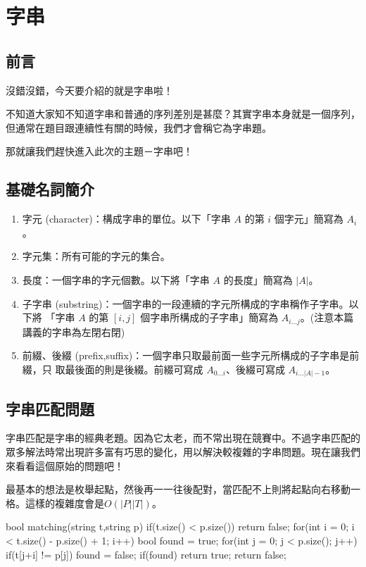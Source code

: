\chapter{字串\uppercase\expandafter{}}

\section{前言}
沒錯沒錯，今天要介紹的就是字串啦！

不知道大家知不知道字串和普通的序列差別是甚麼？其實字串本身就是一個序列，但通常在題目跟連續性有關的時候，我們才會稱它為字串題。

那就讓我們趕快進入此次的主題－字串吧！
\section{基礎名詞簡介}
\begin{enumerate}
\item 字元 (character)：構成字串的單位。以下「字串 $A$ 的第 $i$ 個字元」簡寫為 $A_i$。
\item 字元集：所有可能的字元的集合。
\item 長度：一個字串的字元個數。以下將「字串 $A$ 的長度」簡寫為 $|A|$。
\item 子字串 (substring)：一個字串的一段連續的字元所構成的字串稱作子字串。以下將
「字串 $A$ 的第 $[i, j]$ 個字串所構成的子字串」簡寫為 $A_{i...j}$。(注意本篇講義的字串為左閉右閉)
\item 前綴、後綴 (prefix,suffix)：一個字串只取最前面一些字元所構成的子字串是前綴，只
取最後面的則是後綴。前綴可寫成 $A_{0...i}$、後綴可寫成 $A_{i...|A|-1}$。
\end{enumerate}

\section{字串匹配問題}
字串匹配是字串的經典老題。因為它太老，而不常出現在競賽中。不過字串匹配的眾多解法時常出現許多富有巧思的變化，用以解決較複雜的字串問題。現在讓我們來看看這個原始的問題吧！\\


最基本的想法是枚舉起點，然後再一一往後配對，當匹配不上則將起點向右移動一格。這樣的複雜度會是$O(|P||T|)$。\\

\begin{C++}
bool matching(string t,string p){
    if(t.size() < p.size()) return false;
    for(int i = 0; i < t.size() - p.size() + 1; i++){
        bool found = true;
        for(int j = 0; j < p.size(); j++)
            if(t[j+i] != p[j]) found = false;
        if(found) return true;
    }
    return false;
}
\end{C++}

